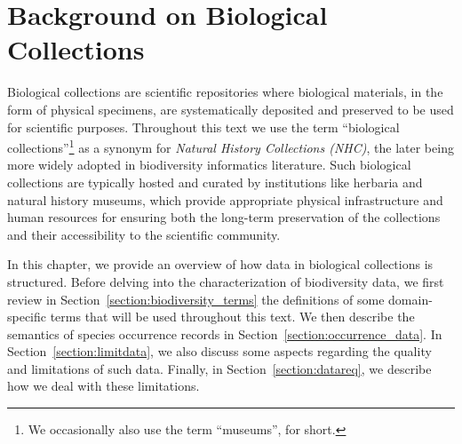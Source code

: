 \chapter{Background on Biological Collections}\label{biodiversity_data}



Biological collections are scientific repositories where biological materials, in the form of physical specimens, are systematically deposited and preserved to be used for scientific purposes. 
Throughout this text we use the term ``biological collections''\footnote{We occasionally also use the term ``museums'', for short.} as a synonym for \textit{Natural History Collections (NHC)}, the later being more widely adopted in biodiversity informatics literature.
Such biological collections are typically hosted and curated by institutions like herbaria and natural history museums, which provide appropriate physical infrastructure and human resources for ensuring both the long-term preservation of the collections and their accessibility to the scientific community.




In this chapter, we provide an overview of how data in biological collections is structured. 
Before delving into the characterization of biodiversity data, we first review in Section~\ref{section:biodiversity_terms} the definitions of some domain-specific terms that will be used throughout this text. We then describe the semantics of species occurrence records in Section~\ref{section:occurrence_data}.
In Section~\ref{section:limitdata}, we also discuss some aspects regarding the quality and limitations of such data. Finally, in Section~\ref{section:datareq}, we describe how we deal with these limitations.
 
